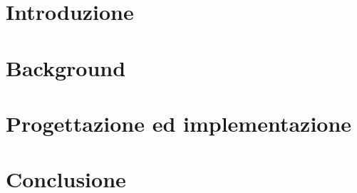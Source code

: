 \documentclass[11pt]{report}
\author{Matteo Cetraro, Massimiliano Sampaolo}
\begin{document}

\tableofcontents
\chapter{Introduzione}

\chapter{Background}

\chapter{Progettazione ed implementazione}

\chapter{Conclusione}

\end{document}
